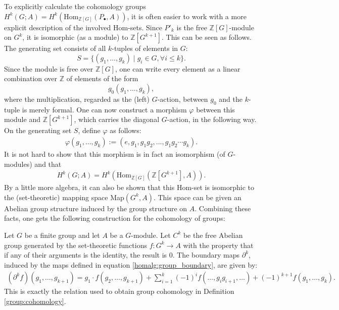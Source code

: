 	To explicitly calculate the cohomology groups $H^k(G; A) = H^k(\text{Hom}_{\mathbb{Z}[G]}(P_\bullet, A))$, it is often easier to work with a more explicit description of the involved Hom-sets. Since $P'_k$ is the free $\mathbb{Z}[G]$-module on $G^k$, it is isomorphic (as a module) to $\mathbb{Z}[G^{k+1}]$. This can be seen as follows. The generating set consists of all $k$-tuples of elements in $G$: \[S=\{(g_1,\ldots,g_k)\mid g_i\in G,\forall i\leq k\}.\] Since the module is free over $\mathbb{Z}[G]$, one can write every element as a linear combination over $\mathbb{Z}$ of elements of the form \[g_0(g_1,\ldots,g_k),\] where the multiplication, regarded as the (left) $G$-action, between $g_0$ and the $k$-tuple is merely formal. One can now construct a morphism $\varphi$ between this module and $\mathbb{Z}[G^{k+1}]$, which carries the diagonal $G$-action, in the following way. On the generating set $S$, define $\varphi$ as follows:
	\begin{gather}
		\varphi(g_1,\ldots,g_k) := (e,g_1,g_1g_2,\ldots,g_1g_2\cdots g_k).
	\end{gather}
	It is not hard to show that this morphism is in fact an isomorphism (of $G$-modules) and that
	\begin{gather}
		H^k(G; A) = H^k(\text{Hom}_{\mathbb{Z}[G]}(\mathbb{Z}[G^{k+1}], A)).
	\end{gather}
	By a little more algebra, it can also be shown that this Hom-set is isomorphic to the (set-theoretic) mapping space Map$(G^k, A)$. This space can be given an Abelian group structure induced by the group structure on $A$. Combining these facts, one gets the following construction for the cohomology of groups:
	\begin{construct}
		Let $G$ be a finite group and let $A$ be a $G$-module. Let $C^k$ be the free Abelian group generated by the set-theoretic functions $f:G^k\rightarrow A$ with the property that if any of their arguments is the identity, the result is 0. The boundary maps $\partial^k$, induced by the maps defined in equation \eqref{homalg:group_boundary}, are given by:
		\begin{gather}
			(\partial^k f)(g_1,\ldots,g_{k+1}) = g_1\cdot f(g_2,\ldots,g_{k+1}) + \sum_{i=1}^k(-1)^if(\ldots,g_ig_{i+1},\ldots) + (-1)^{k+1}f(g_1,\ldots,g_k).
		\end{gather}
		This is exactly the relation used to obtain group cohomology in Definition \ref{group:cohomology}.
	\end{construct}

